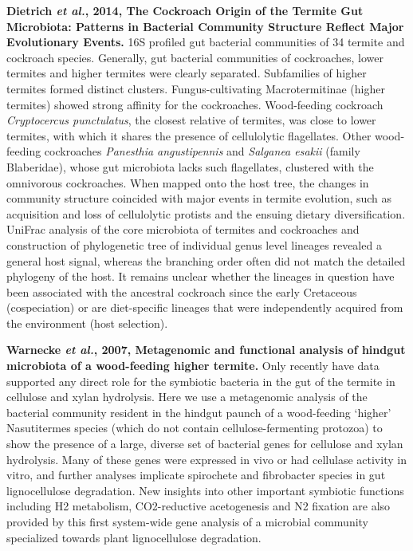 \documentclass[11pt]{article}
\begin{document}
\begin{sloppypar}
\textbf{Dietrich \textit{et al.}, 2014, The Cockroach Origin of the Termite Gut Microbiota: Patterns in Bacterial Community Structure Reflect Major Evolutionary Events.} \newline
16S profiled gut bacterial communities of 34 termite and cockroach species. 
Generally, gut bacterial communities of cockroaches, lower termites and higher termites were clearly separated. 
Subfamilies of higher termites formed distinct clusters. 
Fungus-cultivating Macrotermitinae (higher termites) showed strong affinity for the cockroaches.
Wood-feeding cockroach \textit{Cryptocercus punctulatus}, the closest relative of termites, was close to lower termites, with which it shares the presence of cellulolytic flagellates. 
Other wood-feeding cockroaches \textit{Panesthia angustipennis} and \textit{Salganea esakii} (family Blaberidae), whose gut microbiota lacks such flagellates, clustered with the omnivorous cockroaches. 
When mapped onto the host tree, the changes in community structure coincided with major events in termite evolution, such as acquisition and loss of cellulolytic protists and the ensuing dietary diversification. 
UniFrac analysis of the core microbiota of termites and cockroaches and construction of phylogenetic tree of individual genus level lineages revealed a general host signal, whereas the branching order often did not match the detailed phylogeny of the host. 
It remains unclear whether the lineages in question have been associated with the ancestral cockroach since the early Cretaceous (cospeciation) or are diet-specific lineages that were independently acquired from the environment (host selection).
\par
\textbf{Warnecke \textit{et al.}, 2007, Metagenomic and functional analysis of hindgut microbiota of a wood-feeding higher termite.} \newline
Only recently have data supported any direct role for the symbiotic bacteria in the gut of the termite in cellulose and xylan hydrolysis. 
Here we use a metagenomic analysis of the bacterial community resident in the hindgut paunch of a wood-feeding ‘higher’ Nasutitermes species (which do not contain cellulose-fermenting protozoa) to show the presence of a large, diverse set of bacterial genes for cellulose and xylan hydrolysis. 
Many of these genes were expressed in vivo or had cellulase activity in vitro, and further analyses implicate spirochete and fibrobacter species in gut lignocellulose degradation. 
New insights into other important symbiotic functions including H2 metabolism, CO2-reductive acetogenesis and N2 fixation are also provided by this first system-wide gene analysis of a microbial community specialized towards plant lignocellulose degradation.

\end{sloppypar}
\end{document}
